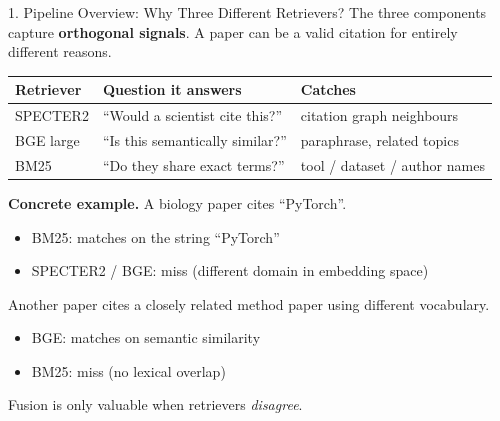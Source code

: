 \documentclass[aspectratio=169, 12pt]{beamer}
\begin{document}
\begin{frame}{1. Pipeline Overview: Why Three Different Retrievers?}
The three components capture \textbf{orthogonal signals}. A paper can be a
valid citation for entirely different reasons.

\vspace{0.6em}
\centering
\small
\begin{tabular}{lll}
\toprule
\textbf{Retriever} & \textbf{Question it answers} & \textbf{Catches} \\
\midrule
SPECTER2 & ``Would a scientist cite this?''  & citation graph neighbours \\
BGE large & ``Is this semantically similar?'' & paraphrase, related topics \\
BM25 & ``Do they share exact terms?''         & tool / dataset / author names \\
\bottomrule
\end{tabular}

\vspace{0.8em}
\raggedright
\small
\textbf{Concrete example.}
A biology paper cites ``PyTorch''.
\begin{itemize}
    \item BM25: \textcolor{improvement}{matches} on the string ``PyTorch''
    \item SPECTER2 / BGE: \textcolor{failure}{miss} (different domain in embedding space)
\end{itemize}
Another paper cites a closely related method paper using different vocabulary.
\begin{itemize}
    \item BGE: \textcolor{improvement}{matches} on semantic similarity
    \item BM25: \textcolor{failure}{miss} (no lexical overlap)
\end{itemize}

Fusion is only valuable when retrievers \emph{disagree}.
\end{frame}
\end{document}
